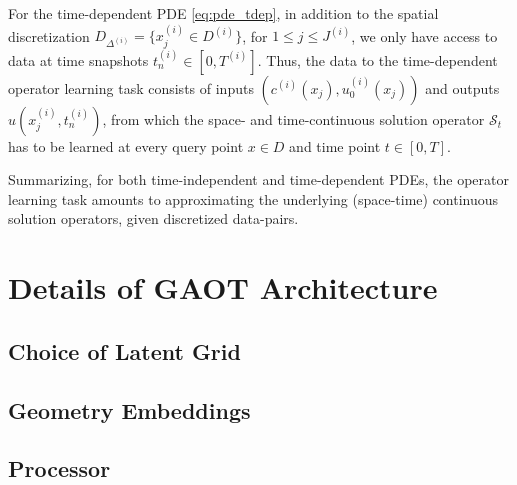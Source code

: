 \documentclass[reqno,10pt]{amsart}
\theoremstyle{plain}
\theoremstyle{definition}
\newcommand{\cal}[1]{\mathcal{#1}}
\begin{document}
\noindent For the time-dependent PDE \ref{eq:pde_tdep}, in addition to the spatial discretization $D_{\Delta^{(i)}} = \{x^{(i)}_j \in D^{(i)}\}$, for $1\leq j \leq J^{(i)}$, we only have access to data at time snapshots $t_n^{(i)} \in [0,T^{(i)}]$. Thus, the data to the time-dependent operator learning task consists of inputs $(c^{(i)}(x_j), u_0^{(i)}(x_j))$ and outputs $u(x_j^{(i)}, t_n^{(i)})$, from which the space- and time-continuous solution operator $\cal S_t$ has to be learned at every query point $x\in D$ and time point $t \in [0,T]$.

\noindent Summarizing, for both time-independent and time-dependent PDEs, the operator learning task amounts to approximating the underlying (space-time) continuous solution operators, given discretized data-pairs.

\section{\bf Details of GAOT Architecture}
\subsection{\bf Choice of Latent Grid} \label{appendix:lgrid}


\subsection{\bf Geometry Embeddings} \label{appendix:gembedd}


\subsection{\bf Processor} \label{appendix:processor}




\end{document}
